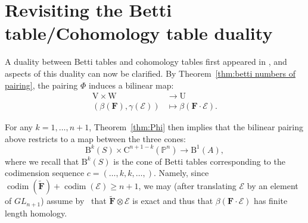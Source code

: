 \documentclass[12pt]{amsart}
\theoremstyle{definition}
\theoremstyle{remark}
\newcommand{\codim}{\operatorname{codim}}
\newcommand{\PP}{\mathbb{P}}
\newcommand{\UU}{\mathrm{U}}
\newcommand{\VV}{\mathrm{V}}
\newcommand{\WW}{\mathrm{W}}
\newcommand{\cc}{c}
\newcommand{\cE}{\mathcal{E}}
\newcommand{\FF}{\mathbf{F}}
\newcommand{\GL}{{GL}}
\newcommand{\CQ}{\mathrm{C}}
\newcommand{\BBQ}{\mathrm{B}}
\begin{document}
\section{Revisiting the Betti table/Cohomology table duality}\label{sec:duality}
A duality between Betti tables and cohomology tables first appeared in \cite{eis-schrey1}, and aspects of this duality
can now be clarified. By Theorem~\ref{thm:betti numbers of pairing}, the pairing $\Phi$ induces a bilinear map:
\begin{align*}
\VV\times \WW & \to \UU\\
(\beta(\FF),\gamma(\cE))&\mapsto \beta(\FF\cdot \cE).
\end{align*}


For any $k=1, \dots, n+1$, Theorem~\ref{thm:Phi} then implies that the bilinear pairing above restricts to a map between the three cones:
\begin{equation}\label{eqn:3cones}
\BBQ^{k}(S)\times \CQ^{n+1-k}(\PP^n)\to \BBQ^1(A),
\end{equation}
where we recall that $\BBQ^k(S)$ is the cone of Betti tables corresponding to the codimension sequence $\cc=(\dots,k,k,\dots,)$.
Namely, since $\codim(\widetilde{\FF})+\codim(\cE)\geq n+1$, we may (after translating $\cE$ by an element of $\GL_{n+1}$) assume by~\cite[Theorem, p. 335]{miller-speyer} that $\widetilde{\FF}\otimes \cE$ is exact and thus that $\beta(\FF\cdot \cE)$ has finite length homology.
\end{document}
